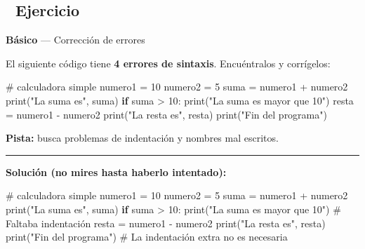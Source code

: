 \documentclass[
  doc,
  floatsintext,
  longtable,
  a4paper,
  nolmodern,
  notxfonts,
  notimes,
  12pt,
  colorlinks=true,linkcolor=blue,citecolor=blue,urlcolor=blue]{apa7}
\newenvironment{Shaded}{\begin{snugshade}}{\end{snugshade}}
\newcommand{\BuiltInTok}[1]{\textcolor[rgb]{0.00,0.23,0.31}{#1}}
\newcommand{\CommentTok}[1]{\textcolor[rgb]{0.37,0.37,0.37}{#1}}
\newcommand{\ControlFlowTok}[1]{\textcolor[rgb]{0.00,0.23,0.31}{\textbf{#1}}}
\newcommand{\DecValTok}[1]{\textcolor[rgb]{0.68,0.00,0.00}{#1}}
\newcommand{\NormalTok}[1]{\textcolor[rgb]{0.00,0.23,0.31}{#1}}
\newcommand{\OperatorTok}[1]{\textcolor[rgb]{0.37,0.37,0.37}{#1}}
\newcommand{\StringTok}[1]{\textcolor[rgb]{0.13,0.47,0.30}{#1}}
\begin{document}
\subsection{📝 Ejercicio}\label{ejercicio}

\textbf{Básico} --- Corrección de errores

El siguiente código tiene \textbf{4 errores de sintaxis}. Encuéntralos y
corrígelos:

\begin{Shaded}
\begin{Highlighting}[]
\CommentTok{\# calculadora simple}
\NormalTok{numero1 }\OperatorTok{=} \DecValTok{10}
\NormalTok{numero2 }\OperatorTok{=} \DecValTok{5}
\NormalTok{suma }\OperatorTok{=}\NormalTok{ numero1 }\OperatorTok{+}\NormalTok{ numero2}
\BuiltInTok{print}\NormalTok{(}\StringTok{"La suma es"}\NormalTok{, suma)}
\ControlFlowTok{if}\NormalTok{ suma }\OperatorTok{\textgreater{}} \DecValTok{10}\NormalTok{:}
\BuiltInTok{print}\NormalTok{(}\StringTok{"La suma es mayor que 10"}\NormalTok{)}
\NormalTok{    resta }\OperatorTok{=}\NormalTok{ numero1 }\OperatorTok{{-}}\NormalTok{ numero2}
\BuiltInTok{print}\NormalTok{(}\StringTok{"La resta es"}\NormalTok{, resta)}
   \BuiltInTok{print}\NormalTok{(}\StringTok{"Fin del programa"}\NormalTok{)}
\end{Highlighting}
\end{Shaded}

\textbf{Pista:} busca problemas de indentación y nombres mal escritos.

\begin{center}\rule{0.5\linewidth}{0.5pt}\end{center}

\textbf{Solución (no mires hasta haberlo intentado):}

\begin{Shaded}
\begin{Highlighting}[]
\CommentTok{\# calculadora simple}
\NormalTok{numero1 }\OperatorTok{=} \DecValTok{10}
\NormalTok{numero2 }\OperatorTok{=} \DecValTok{5}
\NormalTok{suma }\OperatorTok{=}\NormalTok{ numero1 }\OperatorTok{+}\NormalTok{ numero2}
\BuiltInTok{print}\NormalTok{(}\StringTok{"La suma es"}\NormalTok{, suma)}
\ControlFlowTok{if}\NormalTok{ suma }\OperatorTok{\textgreater{}} \DecValTok{10}\NormalTok{:}
    \BuiltInTok{print}\NormalTok{(}\StringTok{"La suma es mayor que 10"}\NormalTok{)  }\CommentTok{\# Faltaba indentación}
\NormalTok{    resta }\OperatorTok{=}\NormalTok{ numero1 }\OperatorTok{{-}}\NormalTok{ numero2}
\BuiltInTok{print}\NormalTok{(}\StringTok{"La resta es"}\NormalTok{, resta)}
\BuiltInTok{print}\NormalTok{(}\StringTok{"Fin del programa"}\NormalTok{)  }\CommentTok{\# La indentación extra no es necesaria}
\end{Highlighting}
\end{Shaded}
\end{document}
